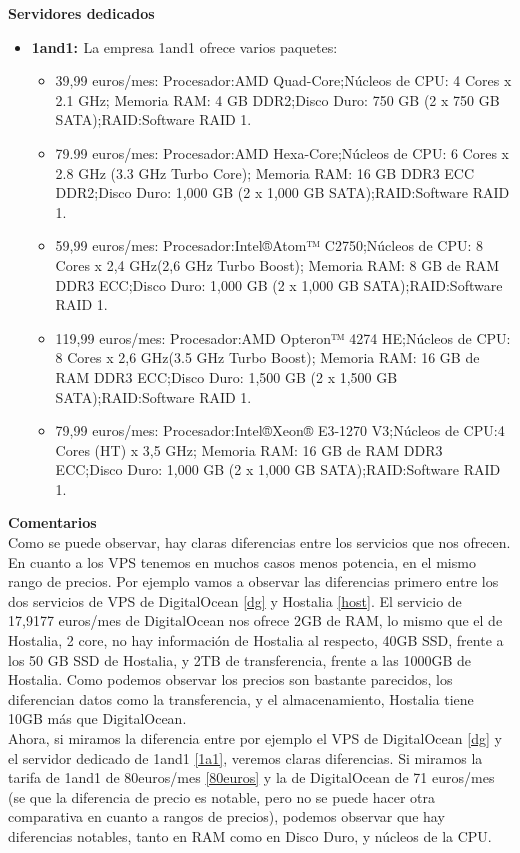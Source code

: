 \begin{itemize}
\textbf{Servidores dedicados}\\
\begin{itemize}
	\item \textbf{1and1: \cite{1and1}} La empresa 1and1 ofrece varios paquetes: \label{1a1} 
		\begin{itemize}
			\item 39,99 euros/mes: Procesador:AMD Quad-Core;Núcleos de CPU: 4 Cores x 2.1 GHz; Memoria RAM: 4 GB DDR2;Disco Duro: 750 GB
			(2 x 750 GB SATA);RAID:Software RAID 1.
			\item 79.99 euros/mes: Procesador:AMD Hexa-Core;Núcleos de CPU: 6 Cores x 2.8 GHz (3.3 GHz Turbo Core); Memoria RAM: 16 GB
			DDR3 ECC DDR2;Disco Duro: 1,000 GB (2 x 1,000 GB SATA);RAID:Software RAID 1.
			\item 59,99 euros/mes:  Procesador:Intel®Atom™ C2750;Núcleos de CPU: 8 Cores x 2,4 GHz(2,6 GHz Turbo Boost); Memoria RAM: 8 GB de RAM DDR3 ECC;Disco Duro: 1,000 GB (2 x 1,000 GB SATA);RAID:Software RAID 1. 
			\item 119,99 euros/mes: Procesador:AMD Opteron™ 4274 HE;Núcleos de CPU: 8 Cores x 2,6 GHz(3.5 GHz Turbo Boost); Memoria RAM: 16 GB de RAM DDR3 ECC;Disco Duro: 1,500 GB (2 x 1,500 GB SATA);RAID:Software RAID 1.
			\item 79,99 euros/mes: Procesador:Intel®Xeon® E3-1270 V3;Núcleos de CPU:4 Cores (HT) x 3,5 GHz; Memoria RAM: 16 GB de RAM DDR3 ECC;Disco Duro: 1,000 GB (2 x 1,000 GB SATA);RAID:Software RAID 1. \label{80euros}
		\end{itemize}
\end{itemize} 
\textbf{Comentarios}\\
Como se puede observar, hay claras diferencias entre los servicios que nos ofrecen. En cuanto a los VPS tenemos en muchos casos menos potencia, en el mismo rango de precios. Por ejemplo vamos a observar las diferencias primero entre los dos servicios de VPS de DigitalOcean \vref{dg} y Hostalia \vref{host}. El servicio de 17,9177 euros/mes de DigitalOcean nos ofrece 2GB de RAM, lo mismo que el de Hostalia, 2 core, no hay información de Hostalia al respecto, 40GB SSD, frente a los 50 GB SSD de Hostalia, y 2TB de transferencia, frente a las 1000GB de Hostalia. Como podemos observar los precios son bastante parecidos, los diferencian datos como la transferencia, y el almacenamiento, Hostalia tiene 10GB más que DigitalOcean. \\
Ahora, si miramos la diferencia entre por ejemplo el VPS de DigitalOcean \vref{dg} y el servidor dedicado de 1and1 \vref{1a1}, veremos claras diferencias. Si miramos la tarifa de 1and1 de 80euros/mes \vref{80euros} y la de DigitalOcean de 71 euros/mes (se que la diferencia de precio es notable, pero no se puede hacer otra comparativa en cuanto a rangos de precios), podemos observar que hay diferencias notables, tanto en RAM como en Disco Duro, y núcleos de la CPU. 

\end{itemize}

